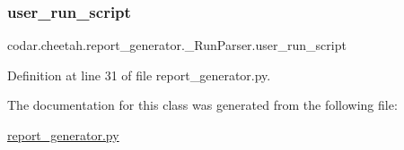 \subsubsection{\texorpdfstring{user\+\_\+run\+\_\+script}{user\_run\_script}}
{\footnotesize\ttfamily codar.\+cheetah.\+report\+\_\+generator.\+\_\+\+Run\+Parser.\+user\+\_\+run\+\_\+script}



Definition at line 31 of file report\+\_\+generator.\+py.



The documentation for this class was generated from the following file\+:\begin{DoxyCompactItemize}
\item 
\hyperlink{report__generator_8py}{report\+\_\+generator.\+py}\end{DoxyCompactItemize}
